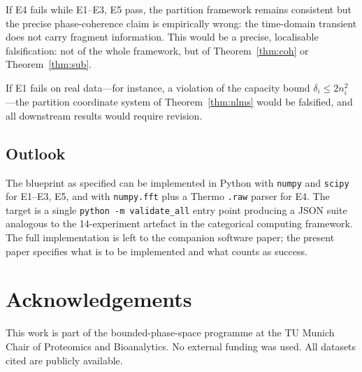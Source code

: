\documentclass[twocolumn,10pt,a4paper]{article}
\theoremstyle{thmstyle}
\theoremstyle{definition}
\theoremstyle{remark}
\begin{document}
If E4 fails while E1--E3, E5 pass, the partition framework remains
consistent but the precise phase-coherence claim is empirically
wrong: the time-domain transient does not carry fragment information.
This would be a precise, localisable falsification: not of the whole
framework, but of Theorem~\ref{thm:coh} or
Theorem~\ref{thm:sub}.

If E1 fails on real data---for instance, a violation of the capacity
bound $\delta_{i}\leq 2n_{i}^{2}$---the partition coordinate system
of Theorem~\ref{thm:nlms} would be falsified, and all downstream
results would require revision.

\subsection{Outlook}

The blueprint as specified can be implemented in Python with
\texttt{numpy} and \texttt{scipy} for E1--E3, E5, and with
\texttt{numpy.fft} plus a Thermo \texttt{.raw} parser for E4. The
target is a single \texttt{python -m validate\_all} entry point
producing a JSON suite analogous to the 14-experiment artefact in
the categorical computing framework. The full implementation is left
to the companion software paper; the present paper specifies what is
to be implemented and what counts as success.

\section*{Acknowledgements}

This work is part of the bounded-phase-space programme at the
TU Munich Chair of Proteomics and Bioanalytics. No external funding
was used. All datasets cited are publicly available.



\end{document}
